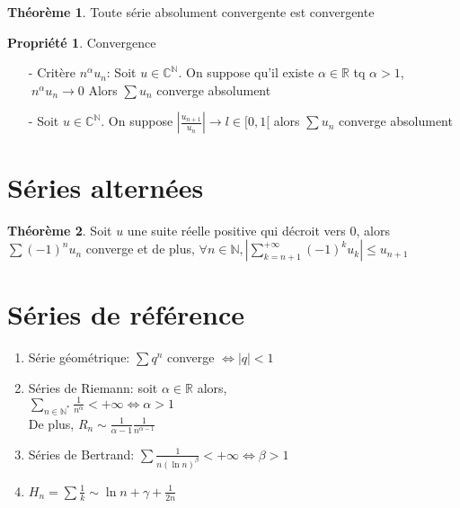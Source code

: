 \documentclass[fleqn]{article}
\theoremstyle{definition} \newtheorem*{defi}{D\'efinition}
\theoremstyle{definition} \newtheorem*{theo}{Th\'eor\`eme}
\theoremstyle{definition} \newtheorem*{coro}{Corollaire}
\theoremstyle{remark} \newtheorem*{rqs}{Remarques}
\theoremstyle{definition} \newtheorem*{prop}{Propri\'et\'e}
\begin{document}
\begin{theo} Toute s\'erie absolument convergente est convergente

\begin{prop} Convergence
	\begin{enumerate}
		\item [-] Crit\`ere $n^\alpha u_n$: Soit $u \in \mathbb{C}^\mathbb{N}$. On suppose qu'il existe $\alpha \in \mathbb{R}$ tq
			$\alpha > 1$, $\ n^\alpha u_n \rightarrow 0$ Alors $\sum u_n $ converge absolument
		\item [-] Soit $u \in \mathbb{C}^\mathbb{N}$. On suppose $|\frac{u_{n+1}}{u_n}| \rightarrow l \in [0,1[$ alors $\sum u_n$ converge
			absolument
	\end{enumerate}
\end{prop}

\end{theo}


\section{S\'eries altern\'ees}
\begin{theo}
	Soit $u$ une suite r\'eelle positive qui d\'ecroit vers $0$, alors $\sum (-1)^n u_n$ converge et de plus, $\forall n \in \mathbb{N},
	|\sum_{k=n+1}^{+\infty} (-1)^k u_k| \leq u_{n+1}$
\end{theo}


\section{S\'eries de r\'ef\'erence}
\begin{enumerate}
	\item S\'erie g\'eom\'etrique: $\sum q^n$ converge $\Leftrightarrow |q| < 1$
	\item S\'eries de Riemann: soit $\alpha \in \mathbb{R}$ alors,\\
		$\sum_{n \in \mathbb{N}^*} \frac{1}{n^\alpha} < +\infty \Leftrightarrow \alpha > 1$ \\
		De plus, $R_n \sim \frac{1}{\alpha -1} \frac{1}{n^{\alpha -1}}$
	\item S\'eries de Bertrand: $\sum \frac{1}{n (\ln n)^\beta} < +\infty \Leftrightarrow \beta > 1$
	\item $H_n = \sum \frac{1}{k} \sim \ln n + \gamma + \frac{1}{2n}$
\end{enumerate}

\end{document}
